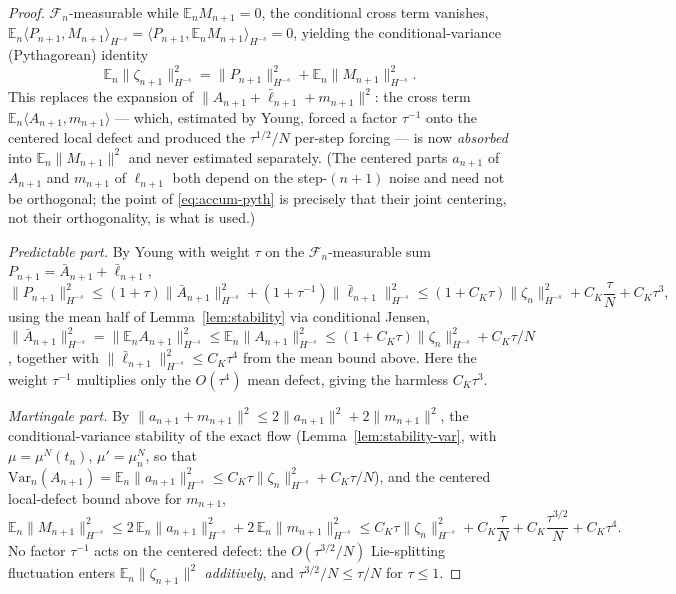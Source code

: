\documentclass[a4paper,fleqn]{cas-sc}
\theoremstyle{definition}
\theoremstyle{remark}
\begin{document}
\begin{proof}
$\mathcal F_n$-measurable while $\mathbb E_n M_{n+1}=0$, the conditional cross term
vanishes,
$\mathbb E_n\langle P_{n+1},M_{n+1}\rangle_{H^{-s}}
=\langle P_{n+1},\mathbb E_n M_{n+1}\rangle_{H^{-s}}=0$, yielding the
conditional-variance (Pythagorean) identity
\begin{equation}\label{eq:accum-pyth}
\mathbb E_n\|\zeta_{n+1}\|_{H^{-s}}^2
=\|P_{n+1}\|_{H^{-s}}^2+\mathbb E_n\|M_{n+1}\|_{H^{-s}}^2 .
\end{equation}
This replaces the expansion of $\|A_{n+1}+\bar\ell_{n+1}+m_{n+1}\|^2$: the cross term
$\mathbb E_n\langle A_{n+1},m_{n+1}\rangle$ --- which, estimated by Young, forced a
factor $\tau^{-1}$ onto the centered local defect and produced the
$\tau^{1/2}/N$ per-step forcing --- is now \emph{absorbed} into
$\mathbb E_n\|M_{n+1}\|^2$ and never estimated separately. (The centered parts
$a_{n+1}$ of $A_{n+1}$ and $m_{n+1}$ of $\ell_{n+1}$ both depend on the
step-$(n{+}1)$ noise and need not be orthogonal; the point of \eqref{eq:accum-pyth}
is precisely that their joint centering, not their orthogonality, is what is used.)

\emph{Predictable part.} By Young with weight $\tau$ on the $\mathcal F_n$-measurable
sum $P_{n+1}=\bar A_{n+1}+\bar\ell_{n+1}$,
\[
\|P_{n+1}\|_{H^{-s}}^2
\le(1+\tau)\|\bar A_{n+1}\|_{H^{-s}}^2+(1+\tau^{-1})\|\bar\ell_{n+1}\|_{H^{-s}}^2
\le(1+C_K\tau)\|\zeta_n\|_{H^{-s}}^2+C_K\frac{\tau}{N}+C_K\tau^3,
\]
using the mean half of Lemma~\ref{lem:stability} via conditional Jensen,
$\|\bar A_{n+1}\|_{H^{-s}}^2=\|\mathbb E_n A_{n+1}\|_{H^{-s}}^2
\le\mathbb E_n\|A_{n+1}\|_{H^{-s}}^2\le(1+C_K\tau)\|\zeta_n\|_{H^{-s}}^2+C_K\tau/N$,
together with $\|\bar\ell_{n+1}\|_{H^{-s}}^2\le C_K\tau^4$ from the mean bound above.
Here the weight $\tau^{-1}$ multiplies only the $O(\tau^4)$ mean defect, giving the
harmless $C_K\tau^3$.

\emph{Martingale part.} By $\|a_{n+1}+m_{n+1}\|^2\le2\|a_{n+1}\|^2+2\|m_{n+1}\|^2$,
the conditional-variance stability of the exact flow
(Lemma~\ref{lem:stability-var}, with $\mu=\mu^N(t_n)$, $\mu'=\mu^N_n$, so that
$\mathrm{Var}_n(A_{n+1})=\mathbb E_n\|a_{n+1}\|_{H^{-s}}^2
\le C_K\tau\|\zeta_n\|_{H^{-s}}^2+C_K\tau/N$), and the centered local-defect bound
above for $m_{n+1}$,
\[
\mathbb E_n\|M_{n+1}\|_{H^{-s}}^2
\le2\,\mathbb E_n\|a_{n+1}\|_{H^{-s}}^2+2\,\mathbb E_n\|m_{n+1}\|_{H^{-s}}^2
\le C_K\tau\|\zeta_n\|_{H^{-s}}^2+C_K\frac{\tau}{N}+C_K\frac{\tau^{3/2}}{N}+C_K\tau^4 .
\]
No factor $\tau^{-1}$ acts on the centered defect: the $O(\tau^{3/2}/N)$
Lie-splitting fluctuation enters $\mathbb E_n\|\zeta_{n+1}\|^2$ \emph{additively},
and $\tau^{3/2}/N\le\tau/N$ for $\tau\le1$.


\end{proof}
\end{document}
